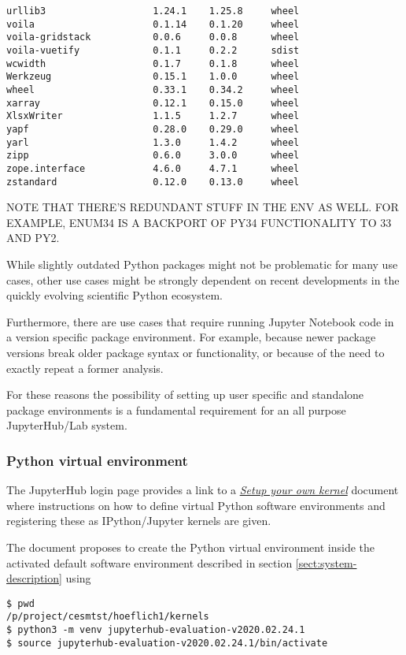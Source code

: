 \begin{verbatim}
urllib3                   1.24.1    1.25.8     wheel
voila                     0.1.14    0.1.20     wheel
voila-gridstack           0.0.6     0.0.8      wheel
voila-vuetify             0.1.1     0.2.2      sdist
wcwidth                   0.1.7     0.1.8      wheel
Werkzeug                  0.15.1    1.0.0      wheel
wheel                     0.33.1    0.34.2     wheel
xarray                    0.12.1    0.15.0     wheel
XlsxWriter                1.1.5     1.2.7      wheel
yapf                      0.28.0    0.29.0     wheel
yarl                      1.3.0     1.4.2      wheel
zipp                      0.6.0     3.0.0      wheel
zope.interface            4.6.0     4.7.1      wheel
zstandard                 0.12.0    0.13.0     wheel
\end{verbatim}

NOTE THAT THERE'S REDUNDANT STUFF IN THE ENV AS WELL. FOR EXAMPLE, ENUM34 IS A BACKPORT OF PY34 FUNCTIONALITY TO 33 AND PY2.

While slightly outdated Python packages might not be problematic for many use cases, other use cases might be strongly dependent on recent developments in the quickly evolving scientific Python ecosystem.

Furthermore, there are use cases that require running Jupyter Notebook code in a version specific package environment.
For example, because newer package versions break older package syntax or functionality, or because of the need to exactly repeat a former analysis.

For these reasons the possibility of setting up user specific and standalone package environments is a fundamental requirement for an all purpose JupyterHub/Lab system.

\subsubsection{Python virtual environment}
\label{sect:python-kernel:virtual-environment}

The JupyterHub login page provides a link to a \href{https://jupyter-jsc.fz-juelich.de/hub/static/files/kernel.html}{\emph{Setup your own kernel}} document where instructions on how to define virtual Python software environments and registering these as IPython/Jupyter kernels are given.

The document proposes to create the Python virtual environment inside the activated default software environment described in section \ref{sect:system-description} using

\begin{verbatim}
$ pwd
/p/project/cesmtst/hoeflich1/kernels
$ python3 -m venv jupyterhub-evaluation-v2020.02.24.1
$ source jupyterhub-evaluation-v2020.02.24.1/bin/activate
\end{verbatim}

